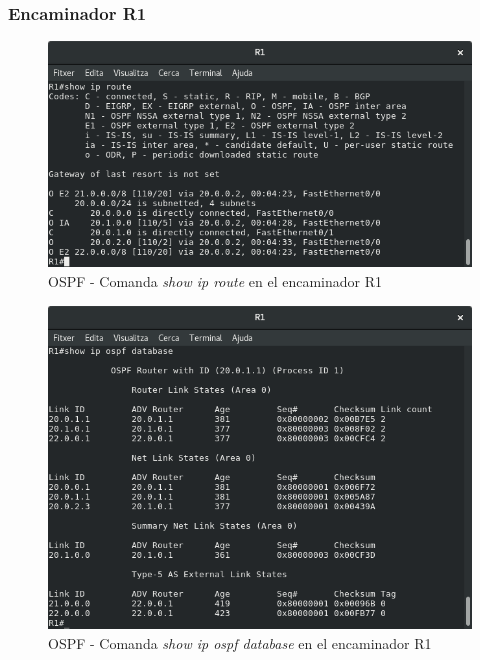 \documentclass[10pt]{article}
\begin{document}
\subsubsection{Encaminador R1}
\begin{figure}[H]
\begin{center}
\includegraphics[scale=0.5]{Images/ospf-R1-route.png}
\caption{OSPF - Comanda \textit{show ip route} en el encaminador R1}
\end{center}
\end{figure}
\begin{figure}[H]
\begin{center}
\includegraphics[scale=0.5]{Images/ospf-R1-database.png}
\caption{OSPF - Comanda \textit{show ip ospf database} en el encaminador R1}
\end{center}
\end{figure}
\end{document}
